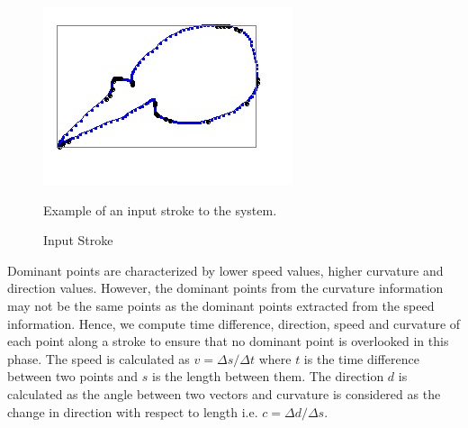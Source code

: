 \documentclass{article}
\begin{document}
\begin{figure}[]
	\centering
		\includegraphics[scale=0.5]{images/stroke3.jpg}
	\caption{Input Stroke} Example of an input stroke to the system. 
	\label{fig:orignalStroke}
\end{figure}
Dominant points are characterized by lower speed values, higher curvature and direction values. However, the dominant points from the curvature information may not be the same points as the dominant points extracted from the speed information. Hence, we compute time difference, direction, speed and curvature of each point along a stroke to ensure that no dominant point is overlooked in this phase. The speed is calculated as $v=\Delta s/\Delta t$ where $t$ is the time difference between two points and $s$ is the length between them. The direction $d$ is calculated as the angle between two vectors and curvature is considered as the change in direction with respect to length i.e. $c= \Delta d/\Delta s$. 
  
\end{document}
